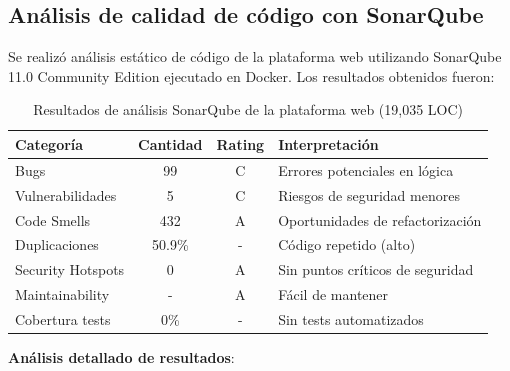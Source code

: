 \subsection{Análisis de calidad de código con SonarQube}

Se realizó análisis estático de código de la plataforma web utilizando SonarQube 11.0 Community Edition ejecutado en Docker. Los resultados obtenidos fueron:

\begin{table}[h]
\centering
\begin{tabular}{|l|c|c|l|}
\hline
\textbf{Categoría} & \textbf{Cantidad} & \textbf{Rating} & \textbf{Interpretación} \\ \hline
Bugs & 99 & C & Errores potenciales en lógica \\ \hline
Vulnerabilidades & 5 & C & Riesgos de seguridad menores \\ \hline
Code Smells & 432 & A & Oportunidades de refactorización \\ \hline
Duplicaciones & 50.9\% & - & Código repetido (alto) \\ \hline
Security Hotspots & 0 & A & Sin puntos críticos de seguridad \\ \hline
Maintainability & - & A & Fácil de mantener \\ \hline
Cobertura tests & 0\% & - & Sin tests automatizados \\ \hline
\end{tabular}
\caption{Resultados de análisis SonarQube de la plataforma web (19,035 LOC)}
\label{tab:sonarqube-results}
\end{table}

\textbf{Análisis detallado de resultados}:


